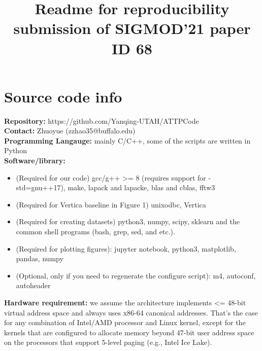 \documentclass[11pt]{article}
\title{Readme for reproducibility submission of SIGMOD'21 paper ID 68}
\author{}
\date{}
\newenvironment{pkl}{%
\begin{itemize}%
\setlength\itemsep{-0.5\parskip}%
\setlength\parsep{0in}%
}{%
\end{itemize}}
\begin{document}
\maketitle

\section{Source code info}

{\bf Repository:} https://github.com/Yanqing-UTAH/ATTPCode\\
{\bf Contact: } Zhuoyue (zzhao35@buffalo.edu) \\
{\bf Programming Langauge:} mainly C/C++, some of the scripts are written in
Python\\
{\bf Software/library:}
\begin{pkl}
    \item (Required for our code) gcc/g++ >= 8 (requires support for
-std=gnu++17), make, lapack and lapacke, blas and cblas, fftw3
    \item (Required for Vertica baseline in Figure 1) unixodbc, Vertica
    \item (Required for creating datasets) python3, numpy, scipy,
sklearn and the common shell programs (bash, grep, sed, and etc.).
    \item (Required for plotting figures): jupyter notebook, python3, matplotlib, pandas, numpy
    \item (Optional, only if you need to regenerate the configure
        script): m4, autoconf, autoheader
\end{pkl}
{\bf Hardware requirement:} we assume the architecture implements <=
48-bit virtual address space and always uses x86-64 canonical
addresses.  That's the case for any combination of Intel/AMD processor
and Linux kernel, except for the kernels that are configured to allocate
memory beyond 47-bit user address space on the processors that
support 5-level paging (e.g., Intel Ice Lake).
\end{document}
